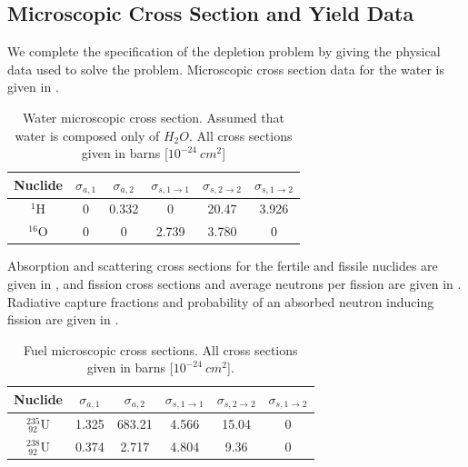 \subsection{Microscopic Cross Section and Yield Data}

We complete the specification of the depletion problem  by giving the physical data used to solve the problem.  
Microscopic cross section data for the water is given in .  
\begin{table}[!htp]
\begin{center}
\begin{tabular}{|c|c|c|c|c|c|}
\hline
Nuclide &		$\sigma_{a,1}$ & $\sigma_{a,2} $& $\sigma_{s,1\to1} $& $\sigma_{s,2\to2}$ & $\sigma_{s,1\to2}$ \\
\hline
$^1\text{H}$   & 0  &  0.332 & 0 & 20.47 & 3.926 \\
\hline
$^{16}\text{O}$&  0 & 0 &  2.739 & 3.780 & 0 \\
\hline
\end{tabular}	
\end{center}
\caption{Water microscopic cross section.  Assumed that water is composed only of $H_{2} O$.  All cross sections given in barns [$10^{-24}~cm^2$]}
\label{tbl:water}
\end{table}
Absorption and scattering cross sections for the fertile and fissile nuclides are given in ,  
and fission cross sections and average neutrons per fission are given in .  
Radiative capture fractions and probability of an absorbed neutron inducing fission are given in .   
\begin{table}[!htp]
\begin{center}
\begin{tabular}{|c|c|c|c|c|c|}
\hline
Nuclide &		$\sigma_{a,1}$ & $\sigma_{a,2} $& $\sigma_{s,1\to1} $& $\sigma_{s,2\to2}$ & $\sigma_{s,1\to2}$ \\
\hline
$^{235} _{~92} \text{U}$   & 1.325 &  683.21 & 4.566 & 15.04 & 0\\
\hline
$^{238} _{~92} \text{U}$   & 0.374 &  2.717 & 4.804 & 9.36 & 0 \\
\hline
\end{tabular}	
\end{center}
\caption{Fuel microscopic cross sections. All cross sections given in barns [$10^{-24}~cm^2$].}
\label{tbl:fresh-fuel}
\end{table}
